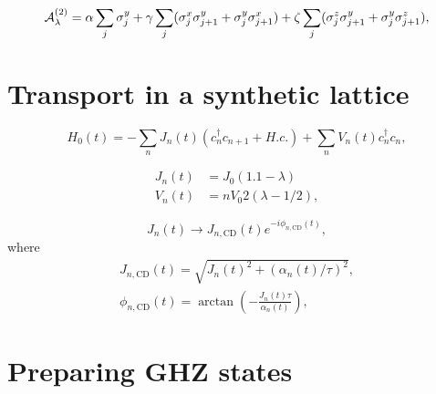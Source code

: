 \begin{equation}
    \mathcal{A}_{\lambda}^{(2)} = \alpha \sum_{j} \sigma^y_j + \gamma  \sum_{j} (\sigma^x_j \sigma^y_{j+1} + \sigma^y_j \sigma^x_{j+1}) +  \zeta \sum_{j} (\sigma^z_j \sigma^y_{j+1} + \sigma^y_j \sigma^z_{j+1}) ,
\end{equation}

\section{Transport in a synthetic lattice}

\begin{equation}\label{eq:lattice_hamiltonian}
    H_0(t) = - \sum_n J_n(t)(c_n^{\dag}c_{n+1} + H.c.) + \sum_n V_n(t) c_n^{\dag}c_n,
\end{equation}

\begin{align} \label{eq:J_lattice}
    J_n(t) &= J_0(1.1 - \lambda) \\ \label{eq:V_lattice}
    V_n(t) &= n V_0 2 (\lambda - 1/2),
\end{align}

\begin{equation}\label{eq:tunneling}
    J_n(t) \rightarrow J_{n, \mathrm{CD}}(t) e^{-i\phi_{n, \mathrm{CD}}(t)},
\end{equation}
where
\begin{align}\label{eq:J_cd}
    J_{n, \mathrm{CD}}(t) = \sqrt{J_n(t)^2 + (\alpha_n(t)/\tau)^2}, \\ \label{eq:phi_cd}
    \phi_{n, \mathrm{CD}}(t)  = \arctan\left(-\frac{J_n(t)\tau}{\alpha_n(t)}\right),
\end{align}

\section{Preparing GHZ states}